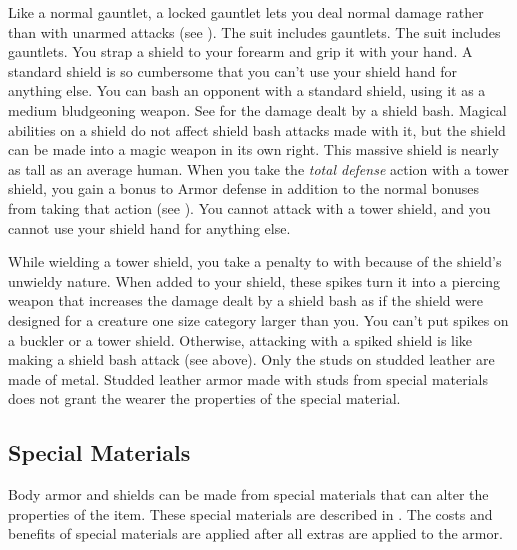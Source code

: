         Like a normal gauntlet, a locked gauntlet lets you deal normal damage rather than  with unarmed attacks (see ).
         The suit includes gauntlets.
         The suit includes gauntlets.
         You strap a shield to your forearm and grip it with your hand. A standard shield is so cumbersome that you can't use your shield hand for anything else.
         You can bash an opponent with a standard shield, using it as a medium bludgeoning weapon. See  for the damage dealt by a shield bash.
        Magical abilities on a shield do not affect shield bash attacks made with it, but the shield can be made into a magic weapon in its own right.
         This massive shield is nearly as tall as an average human.
        When you take the \textit{total defense} action with a tower shield, you gain a  bonus to Armor defense in addition to the normal bonuses from taking that action (see ).
        You cannot attack with a tower shield, and you cannot use your shield hand for anything else.

        While wielding a tower shield, you take a  penalty to  with  because of the shield's unwieldy nature.
         When added to your shield, these spikes turn it into a piercing weapon that increases the damage dealt by a shield bash as if the shield were designed for a creature one size category larger than you. You can't put spikes on a buckler or a tower shield. Otherwise, attacking with a spiked shield is like making a shield bash attack (see above).
         Only the studs on studded leather are made of metal.
        Studded leather armor made with studs from special materials does not grant the wearer the properties of the special material.

    \subsection{Special Materials}\label{Special Materials}
        Body armor and shields can be made from special materials that can alter the properties of the item.
        These special materials are described in .
        The costs and benefits of special materials are applied after all extras are applied to the armor.

